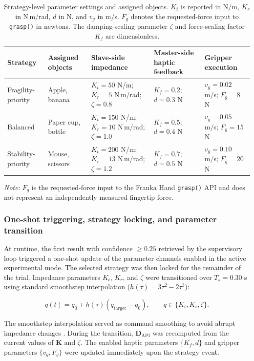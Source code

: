 \begin{table}[!t]
\centering
\caption{Strategy-level parameter settings and assigned objects. $K_t$ is reported in N/m, $K_r$ in N\,m/rad, $d$ in N, and $v_g$ in m/s. $F_g$ denotes the requested-force input to \texttt{grasp()} in newtons. The damping-scaling parameter $\zeta$ and force-scaling factor $K_f$ are dimensionless.}
\label{tab:2}
\small
\setlength{\tabcolsep}{6pt}
\renewcommand{\arraystretch}{1.16}
\begin{tabularx}{\textwidth}{@{}p{}p{}YYY@{}}
\toprule
Strategy & Assigned objects & Slave-side impedance & Master-side haptic feedback & Gripper execution \\
\midrule
Fragility-priority & Apple, banana & $K_t=50$ N/m; $K_r=5$ N\,m/rad; $\zeta=0.8$ & $K_f=0.2$; $d=0.3$ N & $v_g=0.02$ m/s; $F_g=8$ N \\
Balanced & Paper cup, bottle & $K_t=150$ N/m; $K_r=10$ N\,m/rad; $\zeta=1.0$ & $K_f=0.5$; $d=0.4$ N & $v_g=0.05$ m/s; $F_g=15$ N \\
Stability-priority & Mouse, scissors & $K_t=200$ N/m; $K_r=13$ N\,m/rad; $\zeta=1.2$ & $K_f=0.7$; $d=0.5$ N & $v_g=0.10$ m/s; $F_g=20$ N \\
\bottomrule
\end{tabularx}
\par\smallskip
\footnotesize\textit{Note:} $F_g$ is the requested-force input to the Franka Hand \texttt{grasp()} API and does not represent an independently measured fingertip force.
\end{table}
\subsubsection{One-shot triggering, strategy locking, and parameter transition}
At runtime, the first result with confidence $\geq0.25$ retrieved by the supervisory loop triggered a one-shot update of the parameter channels enabled in the active experimental mode. The selected strategy was then locked for the remainder of the trial. Impedance parameters $K_t$, $K_r$, and $\zeta$ were transitioned over $T_s=0.30$ s using standard smoothstep interpolation ($h(\tau)=3\tau^2-2\tau^3$):

\begin{equation}
\label{eq:smoothstep-update}
q(t)=q_0+h(\tau)\left(q_\mathrm{target}-q_0\right),\qquad
q\in\{K_t,K_r,\zeta\}.
\end{equation}

The smoothstep interpolation served as command smoothing to avoid abrupt impedance changes \cite{ref04,ref28}. During the transition, $\mathbf{D}_{\mathrm{API}}$ was recomputed from the current values of $\mathbf{K}$ and $\zeta$. The enabled haptic parameters $\{K_f,d\}$ and gripper parameters $\{v_g,F_g\}$ were updated immediately upon the strategy event.

